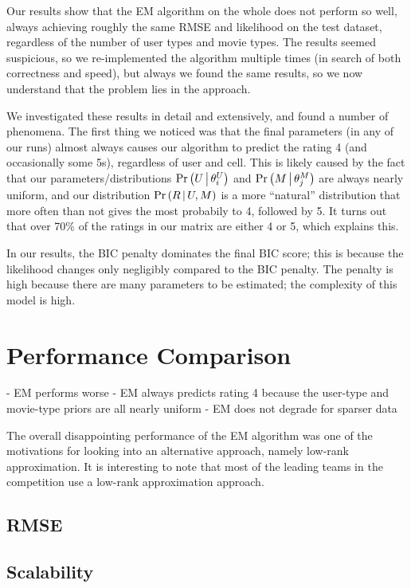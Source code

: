 \documentclass{article}
\begin{document}
Our results show that the EM algorithm on the whole does not perform
so well, always achieving roughly the same RMSE and likelihood on the
test dataset, regardless of the number of user types and movie types.
The results seemed suspicious, so we re-implemented the algorithm
multiple times (in search of both correctness and speed), but always
we found the same results, so we now understand that the problem lies
in the approach.

We investigated these results in detail and extensively, and
found a number of phenomena. The first thing we noticed was that the
final parameters (in any of our runs) almost always causes our
algorithm to predict the rating 4 (and occasionally some 5s),
regardless of user and cell. This is likely caused by the fact that
our parameters/distributions ${{\Pr \left(  U \,\middle|\, \theta^U_i  \right)}}$ and
${{\Pr \left(  M \,\middle|\, \theta^M_j  \right)}}$ are always nearly uniform, and our distribution
${{\Pr \left(  R \,\middle|\, U,M  \right)}}$ is a more ``natural'' distribution that more often than
not gives the most probabily to 4, followed by 5. It turns out that
over 70\% of the ratings in our matrix are either 4 or 5, which
explains this.

In our results, the BIC penalty dominates the final BIC score; this is
because the likelihood changes only negligibly compared to the BIC
penalty. The penalty is high because there are many parameters to be
estimated; the complexity of this model is high.



\section{Performance Comparison}
\label{sec:comparison}

- EM performs worse
  - EM always predicts rating 4 because the user-type and movie-type
    priors are all nearly uniform
- EM does not degrade for sparser data

The overall disappointing performance of the EM algorithm was one of
the motivations for looking into an alternative approach, namely
low-rank approximation. It is interesting to note that most of the
leading teams in the competition use a low-rank approximation
approach.

\subsection{RMSE}

\subsection{Scalability}
\end{document}
